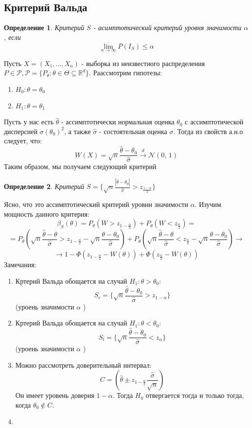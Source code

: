 \documentclass[a4paper,12pt]{article}
\newcommand{\normal}[2]{\mathcal{N}(#1,\,#2)}
\newcommand{\dconv}{\overset{d}{\to}}
\newcommand{\R}{\mathbb{R}}
\newtheorem{dfn}{Определение}[section]
\theoremstyle{named}
\begin{document}
\subsection{Критерий Вальда}
\begin{dfn}
    Критерий $S$ - асимптотический критерий уровня значимости $\alpha$, если 
    $$
    \overline{\lim_{n\to\infty}} P(I_S) \leq \alpha
    $$
\end{dfn}
Пусть $X = (X_1, ..., X_n)$ - выборка из неизвестного распределения $P\in\mathcal{P}, \mathcal{P}= \{P_\theta: \theta \in \Theta 
\subseteq \R^d \}$. Раассмотрим гипотезы:
\begin{enumerate}
    \item $H_0: \theta = \theta_0$
    \item $H_1: \theta = \theta_1$
\end{enumerate}
Пусть у нас есть $\hat\theta$ - ассимптотически нормальная оценка $\theta_0$ с ассимптотической дисперсией $\sigma(\theta_0)^2$, 
а также $\hat\sigma $ - состоятельная оценка $\sigma$. Тогда из свойств а.н.о следует, что:
$$
    W(X) = \sqrt{n}\frac{\hat\theta - \theta_0}{\hat\sigma} \dconv \normal{0}{1}
$$
Таким образом, мы получаем следующий критерий 
\begin{dfn}
    Критерий $S = \{ \sqrt{n}\frac{|\hat\theta - \theta_0|}{\hat\sigma} > z_{\frac{1-\alpha}{2}}\}$
\end{dfn}
Ясно, что это ассимптотический критерий уровни значимости $\alpha$. Изучим мощность данного критерия:
$$
    \beta_S(\theta) = P_\theta(W > z_{1 - \frac{\alpha}{2}}) + P_\theta(W < z_{\frac{\alpha}{2}}) = 
$$
$$
    = P_\theta(\sqrt{n}\frac{\hat\theta - \theta}{\hat\sigma} > z_{1-\frac{\alpha}{2}} - \sqrt{n}\frac{\theta - \theta_0}{\hat\sigma})
    + P_\theta(\sqrt{n}\frac{\hat\theta - \theta}{\hat\sigma} < z_{\frac{\alpha}{2}} - \sqrt{n}\frac{\theta - \theta_0}{\hat\sigma}) \to
$$
$$
    \to 1 - \Phi(z_{1-\frac{\alpha}{2}} - W(\theta)) + \Phi(z_{\frac{\alpha}{2}} - W(\theta))
$$
Замечания: 
\begin{enumerate}
    \item Кртерий Вальда обощается на случай $H_1: \theta > \theta_0$: 
    $$
    S_r = \{\sqrt{n}\frac{\hat\theta - \theta_0}{\hat\sigma} > z_{1-\alpha} \}
    $$
    (уроень значимости $\alpha$ )
    \item Кртерий Вальда обощается на случай $H_1: \theta < \theta_0$: 
    $$
    S_l = \{\sqrt{n}\frac{\hat\theta - \theta_0}{\hat\sigma} < z_{\alpha} \}
    $$
    (уроень значимости $\alpha$ )
    \item Можно рассмотреть доверительный интервал:
    $$
        C = (\hat\theta \pm z_{1-\frac{\alpha}{2}}\frac{\hat\sigma}{\sqrt{n}})
    $$
    Он имеет уровень доверия $1-\alpha$. Тогда $H_0$ отвергается тогда и только тогда, когда
    $\theta_0 \not\in C$.
    \item 
\end{enumerate}
\end{document}
